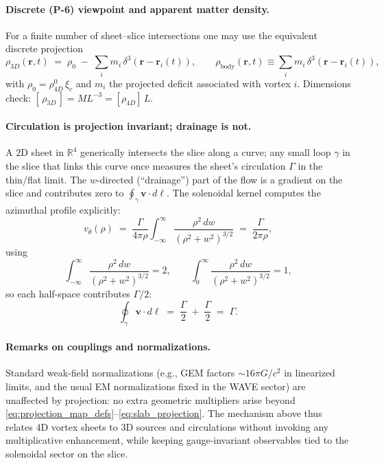 \paragraph{Discrete (P-6) viewpoint and apparent matter density.}
For a finite number of sheet–slice intersections one may use the equivalent discrete projection
\begin{equation}
  \rho_{3D}(\mathbf r,t)
  \;=\;
  \rho_0 \;-\; \sum_i m_i\,\delta^3(\mathbf r-\mathbf r_i(t)),
  \qquad
  \rho_{\text{body}}(\mathbf r,t)\equiv \sum_i m_i\,\delta^3(\mathbf r-\mathbf r_i(t)),
  \label{eq:rho3D_discrete}
\end{equation}
with $\rho_0=\rho_{4D}^0\,\xi_c$ and $m_i$ the projected deficit associated with vortex $i$. Dimensions check: $[\,\rho_{3D}\,]=ML^{-3}= [\rho_{4D}]\,L$.

\paragraph{Circulation is projection invariant; drainage is not.}
A $2$D sheet in $\mathbb R^4$ generically intersects the slice along a curve; any small loop $\gamma$ in the slice that links this curve once measures the sheet's circulation $\Gamma$ in the thin/flat limit. The $w$-directed (“drainage”) part of the flow is a gradient on the slice and contributes zero to $\oint_\gamma \mathbf v\cdot d\boldsymbol\ell$. The solenoidal kernel computes the azimuthal profile explicitly:
\begin{equation}
  v_\theta(\rho)
  \;=\; \frac{\Gamma}{4\pi\rho}\int_{-\infty}^{\infty}
  \frac{\rho^2\,dw}{(\rho^2+w^2)^{3/2}}
  \;=\; \frac{\Gamma}{2\pi\rho},
  \label{eq:vtheta_kernel}
\end{equation}
using
\begin{equation}
  \int_{-\infty}^{\infty} \frac{\rho^2\,dw}{(\rho^2+w^2)^{3/2}}=2,
  \qquad
  \int_{0}^{\infty} \frac{\rho^2\,dw}{(\rho^2+w^2)^{3/2}}=1,
  \label{eq:halfspace_integrals}
\end{equation}
so each half-space contributes $\Gamma/2$:
\begin{equation}
  \oint_{\gamma}\mathbf v\cdot d\boldsymbol{\ell}
  \;=\; \frac{\Gamma}{2} \;+\; \frac{\Gamma}{2} \;=\; \Gamma .
  \label{eq:circulation_split}
\end{equation}

\paragraph{Remarks on couplings and normalizations.}
Standard weak-field normalizations (e.g., GEM factors $\sim 16\pi G/c^2$ in linearized limits, and the usual EM normalizations fixed in the WAVE sector) are unaffected by projection: no extra geometric multipliers arise beyond \eqref{eq:projection_map_defs}–\eqref{eq:slab_projection}. The mechanism above thus relates $4$D vortex sheets to $3$D sources and circulations without invoking any multiplicative enhancement, while keeping gauge-invariant observables tied to the solenoidal sector on the slice.

